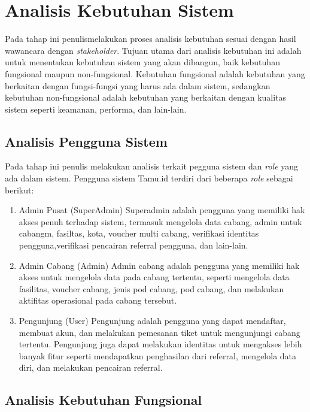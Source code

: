 \section{Analisis Kebutuhan Sistem}

Pada tahap ini penulismelakukan proses analisis kebutuhan sesuai dengan hasil wawancara dengan \textit{stakeholder}. Tujuan utama dari analisis kebutuhan ini adalah untuk menentukan kebutuhan sistem yang akan dibangun, baik kebutuhan fungsional maupun non-fungsional. Kebutuhan fungsional adalah kebutuhan yang berkaitan dengan fungsi-fungsi yang harus ada dalam sistem, sedangkan kebutuhan non-fungsional adalah kebutuhan yang berkaitan dengan kualitas sistem seperti keamanan, performa, dan lain-lain.

\subsection{Analisis Pengguna Sistem}

Pada tahap ini penulis melakukan analisis terkait pegguna sistem dan \textit{role} yang ada dalam sistem. Pengguna sistem Tamu.id terdiri dari beberapa \textit{role} sebagai berikut:
\begin{enumerate}
    \item Admin Pusat (SuperAdmin)
          Superadmin adalah pengguna yang memiliki hak akses penuh terhadap sistem, termasuk mengelola data cabang, admin untuk cabangm, fasiltas, kota, voucher multi cabang, verifikasi identitas pengguna,verifikasi pencairan referral pengguna, dan lain-lain.
    \item Admin Cabang (Admin)
          Admin cabang adalah pengguna yang memiliki hak akses untuk mengelola data pada cabang tertentu, seperti mengelola data fasilitas, voucher cabang, jenis pod cabang, pod cabang, dan melakukan aktifitas operasional pada cabang tersebut.
    \item Pengunjung (User)
          Pengunjung adalah pengguna yang dapat mendaftar, membuat akun, dan melakukan pemesanan tiket untuk mengunjungi cabang tertentu. Pengunjung juga dapat melakukan identitas untuk mengakses lebih banyak fitur seperti mendapatkan penghasilan dari referral, mengelola data diri, dan melakukan pencairan referral.
\end{enumerate}

\subsection{Analisis Kebutuhan Fungsional}

